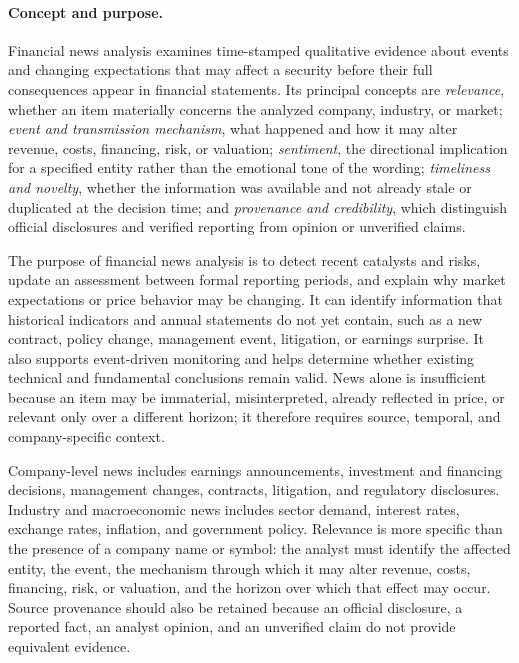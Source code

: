 \paragraph{Concept and purpose.}

Financial news analysis examines time-stamped qualitative evidence about events and changing expectations that may affect a security before their full consequences appear in financial statements. Its principal concepts are \textit{relevance}, whether an item materially concerns the analyzed company, industry, or market; \textit{event and transmission mechanism}, what happened and how it may alter revenue, costs, financing, risk, or valuation; \textit{sentiment}, the directional implication for a specified entity rather than the emotional tone of the wording; \textit{timeliness and novelty}, whether the information was available and not already stale or duplicated at the decision time; and \textit{provenance and credibility}, which distinguish official disclosures and verified reporting from opinion or unverified claims.

The purpose of financial news analysis is to detect recent catalysts and risks, update an assessment between formal reporting periods, and explain why market expectations or price behavior may be changing. It can identify information that historical indicators and annual statements do not yet contain, such as a new contract, policy change, management event, litigation, or earnings surprise. It also supports event-driven monitoring and helps determine whether existing technical and fundamental conclusions remain valid. News alone is insufficient because an item may be immaterial, misinterpreted, already reflected in price, or relevant only over a different horizon; it therefore requires source, temporal, and company-specific context.

Company-level news includes earnings announcements, investment and financing decisions, management changes, contracts, litigation, and regulatory disclosures. Industry and macroeconomic news includes sector demand, interest rates, exchange rates, inflation, and government policy. Relevance is more specific than the presence of a company name or symbol: the analyst must identify the affected entity, the event, the mechanism through which it may alter revenue, costs, financing, risk, or valuation, and the horizon over which that effect may occur. Source provenance should also be retained because an official disclosure, a reported fact, an analyst opinion, and an unverified claim do not provide equivalent evidence.

